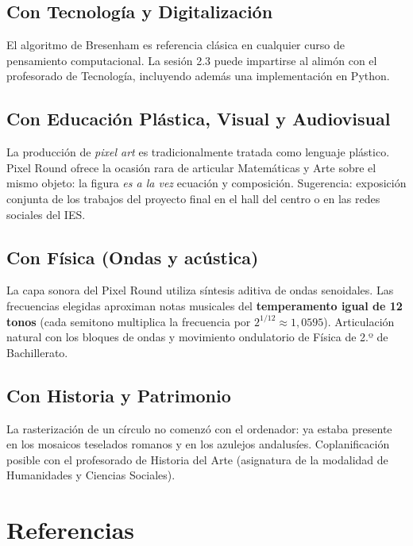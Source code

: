 \documentclass[12pt,a4paper]{scrartcl}
\newcommand{\acc}[1]{\textcolor{accent}{\textbf{#1}}}
\begin{document}
\subsection{Con Tecnología y Digitalización}
El algoritmo de Bresenham es referencia clásica en cualquier curso de pensamiento computacional. La sesión 2.3 puede impartirse al alimón con el profesorado de Tecnología, incluyendo además una implementación en Python.

\subsection{Con Educación Plástica, Visual y Audiovisual}
La producción de \emph{pixel art} es tradicionalmente tratada como lenguaje plástico. Pixel Round ofrece la ocasión rara de articular Matemáticas y Arte sobre el mismo objeto: la figura \emph{es a la vez} ecuación y composición. Sugerencia: exposición conjunta de los trabajos del proyecto final en el hall del centro o en las redes sociales del IES.

\subsection{Con Física (Ondas y acústica)}
La capa sonora del Pixel Round utiliza síntesis aditiva de ondas senoidales. Las frecuencias elegidas aproximan notas musicales del \acc{temperamento igual de 12 tonos} (cada semitono multiplica la frecuencia por $2^{1/12} \approx 1{,}0595$). Articulación natural con los bloques de ondas y movimiento ondulatorio de Física de 2.º de Bachillerato.

\subsection{Con Historia y Patrimonio}
La rasterización de un círculo no comenzó con el ordenador: ya estaba presente en los mosaicos teselados romanos y en los azulejos andalusíes. Coplanificación posible con el profesorado de Historia del Arte (asignatura de la modalidad de Humanidades y Ciencias Sociales).

\section{Referencias}
\end{document}
